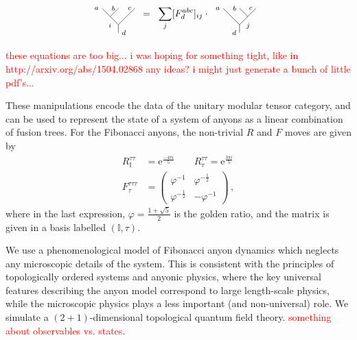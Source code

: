 \documentclass[aps, prl, letterpaper, twocolumn, superscriptaddress, notitlepage, 10pt]{revtex4-1}
\newcommand{\e}{\mathrm{e}}
\newcommand{\dude}[1]{\textcolor{red}{#1}}
\begin{document}
	\begin{align}
		\begin{tikzpicture}[baseline=0.6cm,scale=0.3]
			\draw(0,0)--(0,1)--(-2,3);
			\draw(0,3)--(-1,2);
			\draw(2,3)--(0,1);
			\node at (-0.45,1.6) [anchor=north east] {{\scriptsize $i$}};
			\node at (0,0) [anchor=west] {{\scriptsize $d$}};
			\node at (2,3) [anchor=east] {{\scriptsize $c$}};
			\node at (0,3) [anchor=east] {{\scriptsize $b$}};
			\node at (-2,3) [anchor=east] {{\scriptsize $a$}};
		\end{tikzpicture}
		&\;\;=\;\;\sum_j[F^{abc}_d]_{ij}\cdot\;
		\begin{tikzpicture}[baseline=0.6cm,scale=0.3]		
			\draw(0,0)--(0,1)--(-2,3);
			\draw(0,3)--(1,2);
			\draw(2,3)--(0,1);
			\node at (0.42,1.63) [anchor=north west] {{\scriptsize $j$}};
			\node at (0,0) [anchor=east] {{\scriptsize $d$}};
			\node at (2,3) [anchor=east] {{\scriptsize $c$}};
			\node at (0,3) [anchor=east] {{\scriptsize $b$}};
			\node at (-2,3) [anchor=east] {{\scriptsize $a$}};
		\end{tikzpicture}
	\end{align}

\dude{these equations are too big... i was hoping for something tight, like
in http://arxiv.org/abs/1504.02868
any ideas? i might just generate a bunch of little pdf's...
}


These manipulations encode the data of the unitary modular tensor category, and can be used to represent the state of a system of anyons as a linear combination of fusion trees. For the Fibonacci anyons, the non-trivial $R$ and $F$ moves are given by
\begin{align}
	R_{\mathbb{I}}^{\tau\tau}&= \e^{\frac{-4\pi i}{5}}\qquad R_\tau^{\tau\tau}= \e^{\frac{3\pi i}{5}}\\
	F_{\tau}^{\tau\tau\tau} &= \begin{pmatrix}\varphi^{-1}&\varphi^{-\frac{1}{2}}\\\varphi^{-\frac{1}{2}}&-\varphi^{-1}\end{pmatrix} \,,
\end{align}
where in the last expression, $\varphi=\frac{1+\sqrt{5}}{2}$ is the golden ratio, and the matrix is given in a basis labelled $(\mathbb{I},\tau)$.

We use a phenomenological model of Fibonacci anyon dynamics which neglects any 
microscopic details of the system. 
This is consistent with the principles of topologically 
ordered systems and anyonic physics, where the key universal features describing the 
anyon model correspond to large length-scale physics, while the microscopic physics plays 
a less important (and non-universal) role.
We simulate a $(2+1)$-dimensional topological quantum field theory.
\dude{something about observables vs. states.}
\end{document}

